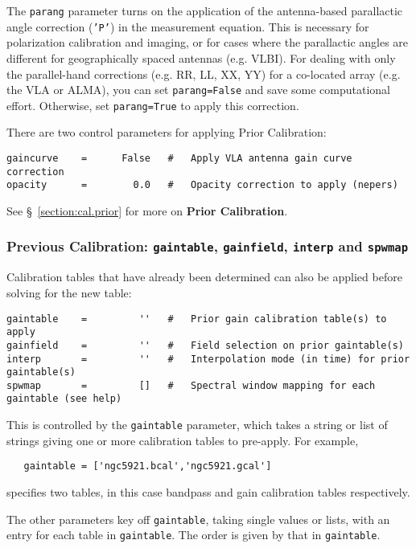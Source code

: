 The {\tt parang} parameter turns on the application of the
antenna-based parallactic angle correction ({\tt 'P'}) in the
measurement equation.  This is necessary for polarization calibration
and imaging, or for cases where the parallactic angles are different
for geographically spaced antennas (e.g. VLBI).  For dealing with only
the parallel-hand corrections (e.g. RR, LL, XX, YY) for a co-located
array (e.g. the VLA or ALMA), you can set {\tt parang=False} and save
some computational effort.  Otherwise, set {\tt parang=True} to apply
this correction.

There are two control parameters for applying Prior Calibration:
\small
\begin{verbatim}
gaincurve    =      False   #   Apply VLA antenna gain curve correction
opacity      =        0.0   #   Opacity correction to apply (nepers)
\end{verbatim}
\normalsize

See \S~\ref{section:cal.prior} for more on {\bf Prior Calibration}.

\subsubsection{Previous Calibration: {\tt gaintable},
{\tt gainfield}, {\tt interp} and {\tt spwmap} }
\label{section:cal.solve.pars.previous}

Calibration tables that have already been determined can also be
applied before solving for the new table:
\small
\begin{verbatim}
gaintable    =         ''   #   Prior gain calibration table(s) to apply
gainfield    =         ''   #   Field selection on prior gaintable(s)
interp       =         ''   #   Interpolation mode (in time) for prior gaintable(s)
spwmap       =         []   #   Spectral window mapping for each gaintable (see help)
\end{verbatim}
\normalsize

This is controlled by the {\tt gaintable} parameter, which takes 
a string or list of strings giving one or more calibration tables 
to pre-apply.  For example,

\small
\begin{verbatim}
   gaintable = ['ngc5921.bcal','ngc5921.gcal']
\end{verbatim}
\normalsize
specifies two tables, in this case bandpass and gain calibration tables
respectively.

The other parameters key off {\tt gaintable}, taking single values or
lists, with an entry for each table in {\tt gaintable}.  The order is
given by that in {\tt gaintable}.

